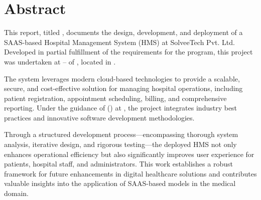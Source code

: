\chapter*{Abstract}
This report, titled , documents the design, development, and deployment of a SAAS-based Hospital Management System (HMS) at SolveeTech Pvt. Ltd. Developed in partial fulfillment of the requirements for the  program, this project was undertaken at  –  of , located in . 

The system leverages modern cloud-based technologies to provide a scalable, secure, and cost-effective solution for managing hospital operations, including patient registration, appointment scheduling, billing, and comprehensive reporting. Under the guidance of  () at , the project integrates industry best practices and innovative software development methodologies. 

Through a structured development process—encompassing thorough system analysis, iterative design, and rigorous testing—the deployed HMS not only enhances operational efficiency but also significantly improves user experience for patients, hospital staff, and administrators. This work establishes a robust framework for future enhancements in digital healthcare solutions and contributes valuable insights into the application of SAAS-based models in the medical domain.

\pagebreak
